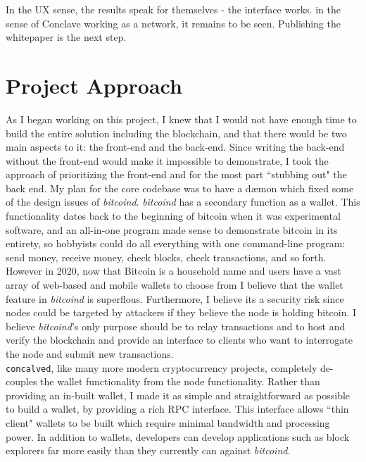 \documentclass{report}
\begin{document}
	In the UX sense, the results speak for themselves - the interface works. in the sense of Conclave working as a network, it remains to be seen. Publishing the whitepaper is the next step.
	\section{Project Approach}
	As I began working on this project, I knew that I would not have enough time to build the entire solution including the blockchain, and that there would be two main aspects to it: the front-end and the back-end. Since writing the back-end without the front-end would make it impossible to demonstrate, I took the approach of prioritizing the front-end and for the most part ``stubbing out" the back end. My plan for the core codebase was to have a dæmon which fixed some of the design issues of \textit{bitcoind}. \textit{bitcoind} has a secondary function as a wallet. This functionality dates back to the beginning of bitcoin when it was experimental software, and an all-in-one program made sense to demonstrate bitcoin in its entirety, so hobbyists could do all everything with one command-line program: send money, receive money, check blocks, check transactions, and so forth. \\
	
	However in 2020, now that Bitcoin is a household name and users have a vast array of web-based and mobile wallets to choose from I believe that the wallet feature in \textit{bitcoind}  is superflous. Furthermore, I believe its a security risk since nodes could be targeted by attackers if they believe the node is holding bitcoin. I believe \textit{bitcoind}'s only purpose should be to relay transactions and to host and verify the blockchain and provide an interface to clients who want to interrogate the node and submit new transactions. \\
	
	\texttt{concalved}, like many more modern cryptocurrency projects, completely de-couples the wallet functionality from the node functionality. Rather than providing an in-built wallet, I made it as simple and straightforward as possible to build a wallet, by providing a rich RPC interface. This interface allows ``thin client"   wallets to be built which require minimal bandwidth and processing power. In addition to wallets,  developers can develop applications such as block explorers far more easily than they currently can against \textit{bitcoind}. \\
	
\end{document}
